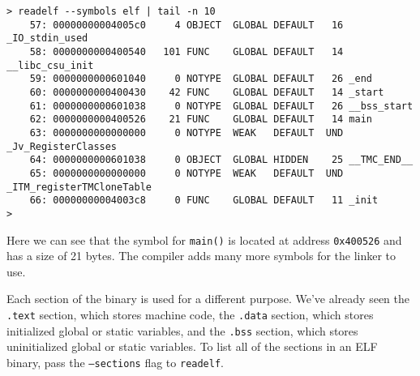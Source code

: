 \begin{lstlisting}
> readelf --symbols elf | tail -n 10
    57: 00000000004005c0     4 OBJECT  GLOBAL DEFAULT   16 _IO_stdin_used
    58: 0000000000400540   101 FUNC    GLOBAL DEFAULT   14 __libc_csu_init
    59: 0000000000601040     0 NOTYPE  GLOBAL DEFAULT   26 _end
    60: 0000000000400430    42 FUNC    GLOBAL DEFAULT   14 _start
    61: 0000000000601038     0 NOTYPE  GLOBAL DEFAULT   26 __bss_start
    62: 0000000000400526    21 FUNC    GLOBAL DEFAULT   14 main
    63: 0000000000000000     0 NOTYPE  WEAK   DEFAULT  UND _Jv_RegisterClasses
    64: 0000000000601038     0 OBJECT  GLOBAL HIDDEN    25 __TMC_END__
    65: 0000000000000000     0 NOTYPE  WEAK   DEFAULT  UND _ITM_registerTMCloneTable
    66: 00000000004003c8     0 FUNC    GLOBAL DEFAULT   11 _init
> 
\end{lstlisting}

Here we can see that the symbol for \texttt{main()} is located at address
\texttt{0x400526} and has a size of 21 bytes. The compiler adds many more
symbols for the linker to use.

Each section of the binary is used for a different purpose. We've already seen
the  \texttt{.text} section, which stores machine code, the \texttt{.data}
section, which stores initialized global or static variables, and the
\texttt{.bss} section, which stores uninitialized global or static variables. To
list all of the sections in an ELF binary, pass the \texttt{--sections} flag to
\texttt{readelf}.

